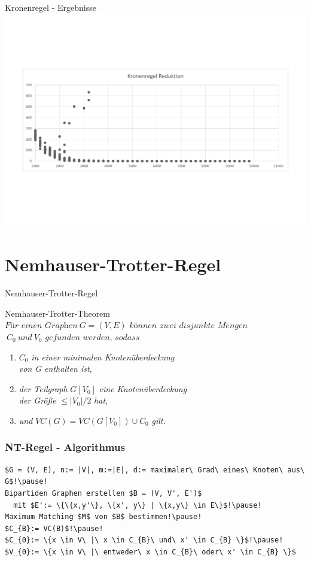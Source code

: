 \documentclass{beamer}
\begin{document}
\begin{frame}{Kronenregel - Ergebnisse}
\includegraphics[scale= .4]{analysisCrown.pdf} 
\end{frame}

\section{Nemhauser-Trotter-Regel}
	
\begin{frame}{Nemhauser-Trotter-Regel}
\begin{block}{Nemhauser-Trotter-Theorem}
$\textit{Für einen Graphen}\ G=(V,E)\textit{ können zwei disjunkte Mengen}$\\ $\ C_{0}\ und\ V_{0} \textit{ gefunden werden, sodass}$\pause
\begin{enumerate}
\item $C_{0}$ \textit{ in einer minimalen Knotenüberdeckung} \\
\textit{von G enthalten ist,}\pause
\item \textit{der Teilgraph }$G[V_{0}]$ \textit{eine Knotenüberdeckung}\\
\textit{der Größe} $\leq |V_{0}| / 2$ \textit{ hat,}\pause
\item \textit{und} $VC(G) = VC(G[V_{0}])\cup C_{0}$ \textit{ gilt.}
\end{enumerate}

\end{block}
\end{frame}
	
\begin{frame}[fragile]
\frametitle{NT-Regel - Algorithmus}
\begin{lstlisting}[mathescape = true, basicstyle=\ttfamily, escapechar = !]
$G = (V, E), n:= |V|, m:=|E|, d:= maximaler\ Grad\ eines\ Knoten\ aus\ G$!\pause!
Bipartiden Graphen erstellen $B = (V, V', E')$
  mit $E':= \{\{x,y'\}, \{x', y\} | \{x,y\} \in E\}$!\pause!
Maximum Matching $M$ von $B$ bestimmen!\pause!
$C_{B}:= VC(B)$!\pause!
$C_{0}:= \{x \in V\ |\ x \in C_{B}\ und\ x' \in C_{B} \}$!\pause!
$V_{0}:= \{x \in V\ |\ entweder\ x \in C_{B}\ oder\ x' \in C_{B} \}$
\end{lstlisting}

\end{frame}
\end{document}
